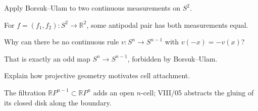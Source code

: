 \begin{problem}\label{prob:viii04-18}
Apply Borsuk--Ulam to two continuous measurements on \(S^2\).
\end{problem}
\begin{solution}
For \(f=(f_1,f_2):S^2\to\mathbb R^2\), some antipodal pair has both measurements equal.
\end{solution}

\begin{problem}\label{prob:viii04-19}
Why can there be no continuous rule \(v:S^n\to S^{n-1}\) with \(v(-x)=-v(x)\)?
\end{problem}
\begin{solution}
That is exactly an odd map \(S^n\to S^{n-1}\), forbidden by Borsuk--Ulam.
\end{solution}

\begin{problem}\label{prob:viii04-20}
Explain how projective geometry motivates cell attachment.
\end{problem}
\begin{solution}
The filtration \(\mathbb RP^{n-1}\subset\mathbb RP^n\) adds an open \(n\)-cell; VIII/05 abstracts the gluing of its closed disk along the boundary.
\end{solution}
